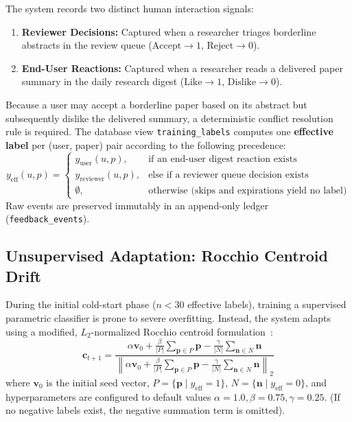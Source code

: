 The system records two distinct human interaction signals:
\begin{enumerate}
    \item \textbf{Reviewer Decisions:} Captured when a researcher triages borderline abstracts in the review queue ($\text{Accept} \to 1$, $\text{Reject} \to 0$).
    \item \textbf{End-User Reactions:} Captured when a researcher reads a delivered paper summary in the daily research digest ($\text{Like} \to 1$, $\text{Dislike} \to 0$).
\end{enumerate}

Because a user may accept a borderline paper based on its abstract but subsequently dislike the delivered summary, a deterministic conflict resolution rule is required. The database view \texttt{training\_labels} computes one \textbf{effective label} per (user, paper) pair according to the following precedence:
\begin{equation}
y_{\text{eff}}(u, p) = \begin{cases}
y_{\text{user}}(u, p), & \text{if an end-user digest reaction exists} \\
y_{\text{reviewer}}(u, p), & \text{else if a reviewer queue decision exists} \\
\emptyset, & \text{otherwise (skips and expirations yield no label)}
\end{cases}
\end{equation}
Raw events are preserved immutably in an append-only ledger (\texttt{feedback\_events}).

\subsection{Unsupervised Adaptation: Rocchio Centroid Drift}
\label{sec:rocchio}

During the initial cold-start phase ($n < 30$ effective labels), training a supervised parametric classifier is prone to severe overfitting. Instead, the system adapts using a modified, $L_2$-normalized Rocchio centroid formulation~\cite{rocchio1971relevance}:
\begin{equation}
\mathbf{c}_{t+1} = \frac{\alpha \mathbf{v}_0 + \frac{\beta}{|P|} \sum_{\mathbf{p} \in P} \mathbf{p} - \frac{\gamma}{|N|} \sum_{\mathbf{n} \in N} \mathbf{n}}{\left\| \alpha \mathbf{v}_0 + \frac{\beta}{|P|} \sum_{\mathbf{p} \in P} \mathbf{p} - \frac{\gamma}{|N|} \sum_{\mathbf{n} \in N} \mathbf{n} \right\|_2}
\end{equation}
where $\mathbf{v}_0$ is the initial seed vector, $P = \{\mathbf{p} \mid y_{\text{eff}} = 1\}$, $N = \{\mathbf{n} \mid y_{\text{eff}} = 0\}$, and hyperparameters are configured to default values $\alpha = 1.0, \beta = 0.75, \gamma = 0.25$. (If no negative labels exist, the negative summation term is omitted).

